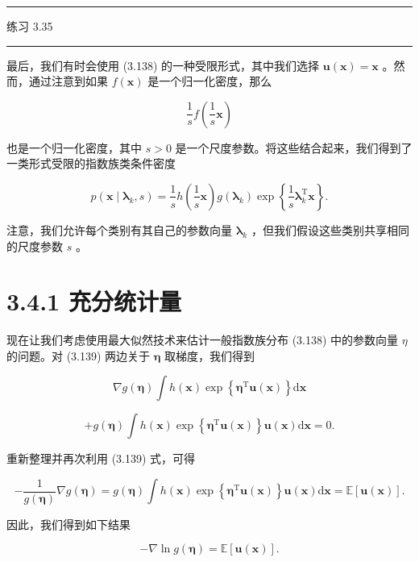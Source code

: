 \documentclass[10pt]{article}
\newcommand{\HRule}{\begin{center}\rule{0.9\linewidth}{0.2mm}\end{center}}
\begin{document}
\HRule

练习 3.35

\HRule

最后，我们有时会使用 (3.138) 的一种受限形式，其中我们选择 \(\mathbf{u}\left( \mathbf{x}\right)  = \mathbf{x}\) 。然而，通过注意到如果 \(f\left( \mathbf{x}\right)\) 是一个归一化密度，那么

\[
\frac{1}{s}f\left( {\frac{1}{s}\mathbf{x}}\right)  \tag{3.168}
\]

也是一个归一化密度，其中 \(s > 0\) 是一个尺度参数。将这些结合起来，我们得到了一类形式受限的指数族类条件密度

\[
p\left( {\mathbf{x} \mid  {\mathbf{\lambda }}_{k},s}\right)  = \frac{1}{s}h\left( {\frac{1}{s}\mathbf{x}}\right) g\left( {\mathbf{\lambda }}_{k}\right) \exp \left\{  {\frac{1}{s}{\mathbf{\lambda }}_{k}^{\mathrm{T}}\mathbf{x}}\right\}  . \tag{3.169}
\]

注意，我们允许每个类别有其自己的参数向量 \({\mathbf{\lambda }}_{k}\) ，但我们假设这些类别共享相同的尺度参数 \(s\) 。

\section*{3.4.1 充分统计量}

现在让我们考虑使用最大似然技术来估计一般指数族分布 (3.138) 中的参数向量 \(\eta\) 的问题。对 (3.139) 两边关于 \(\mathbf{\eta }\) 取梯度，我们得到

\[
\nabla g\left( \mathbf{\eta }\right) \int h\left( \mathbf{x}\right) \exp \left\{  {{\mathbf{\eta }}^{\mathrm{T}}\mathbf{u}\left( \mathbf{x}\right) }\right\}  \mathrm{d}\mathbf{x}
\]

\[
+ g\left( \mathbf{\eta }\right) \int h\left( \mathbf{x}\right) \exp \left\{  {{\mathbf{\eta }}^{\mathrm{T}}\mathbf{u}\left( \mathbf{x}\right) }\right\}  \mathbf{u}\left( \mathbf{x}\right) \mathrm{d}\mathbf{x} = 0. \tag{3.170}
\]

重新整理并再次利用 (3.139) 式，可得

\[
- \frac{1}{g\left( \mathbf{\eta }\right) }\nabla g\left( \mathbf{\eta }\right)  = g\left( \mathbf{\eta }\right) \int h\left( \mathbf{x}\right) \exp \left\{  {{\mathbf{\eta }}^{\mathrm{T}}\mathbf{u}\left( \mathbf{x}\right) }\right\}  \mathbf{u}\left( \mathbf{x}\right) \mathrm{d}\mathbf{x} = \mathbb{E}\left\lbrack  {\mathbf{u}\left( \mathbf{x}\right) }\right\rbrack  . \tag{3.171}
\]

因此，我们得到如下结果

\[
- \nabla \ln g\left( \mathbf{\eta }\right)  = \mathbb{E}\left\lbrack  {\mathbf{u}\left( \mathbf{x}\right) }\right\rbrack  . \tag{3.172}
\]
\end{document}
